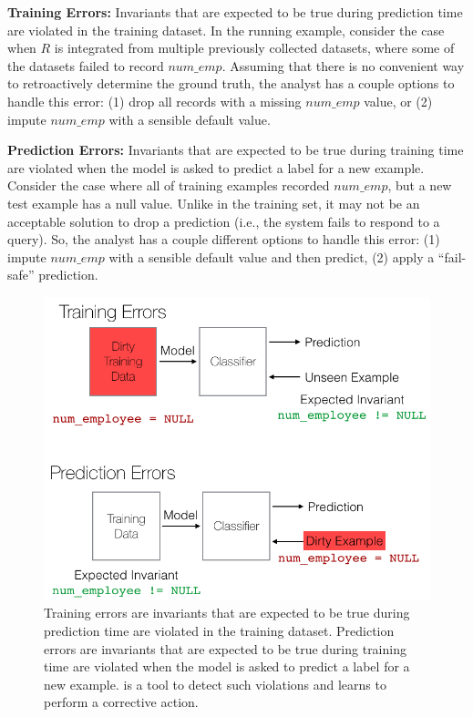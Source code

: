 \vspace{0.5em}\noindent\textbf{Training Errors: } Invariants that are expected to be true during prediction time are violated in the training dataset. In the running example, consider the case when $R$ is integrated from multiple previously collected datasets, where some of the datasets failed to record $num\_emp$. Assuming that there is no convenient way to retroactively determine the ground truth, the analyst has a couple options to handle this error: (1) drop all records with a missing  $num\_emp$ value, or (2) impute $num\_emp$ with a sensible default value.

\vspace{0.25em}\noindent\textbf{Prediction Errors: } Invariants that are expected to be true during training time are violated when the model is asked to predict a label for a new example. 
Consider the case where all of training examples recorded $num\_emp$, but a new test example has a null value.
Unlike in the training set, it may not be an acceptable solution to drop a prediction (i.e., the system fails to respond to a query).
So, the analyst has a couple different options to handle this error: (1) impute $num\_emp$ with a sensible default value and then predict, (2) apply a ``fail-safe'' prediction.

\begin{figure}[t]
\centering
 \includegraphics[width=0.8\columnwidth]{figures/training_and_pred_errors.png}
 \caption{Training errors are invariants that are expected to be true during prediction time are violated in the training dataset. Prediction errors are invariants that are expected to be true during training time are violated when the model is asked to predict a label for a new example. \sys is a tool to detect such violations and learns to perform a corrective action.
 \label{fig:error}}
\end{figure}

